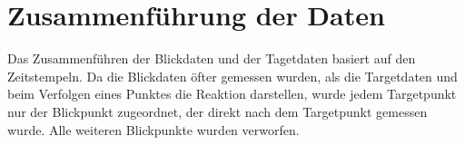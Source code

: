 \chapter{Zusammenf\"uhrung der Daten}
Das Zusammenf\"uhren der Blickdaten und der Tagetdaten basiert auf den Zeitstempeln. Da die Blickdaten \"ofter gemessen wurden, als die Targetdaten und beim Verfolgen eines Punktes die Reaktion darstellen, wurde jedem Targetpunkt nur der Blickpunkt zugeordnet, der direkt nach dem Targetpunkt gemessen wurde. Alle weiteren Blickpunkte wurden verworfen.